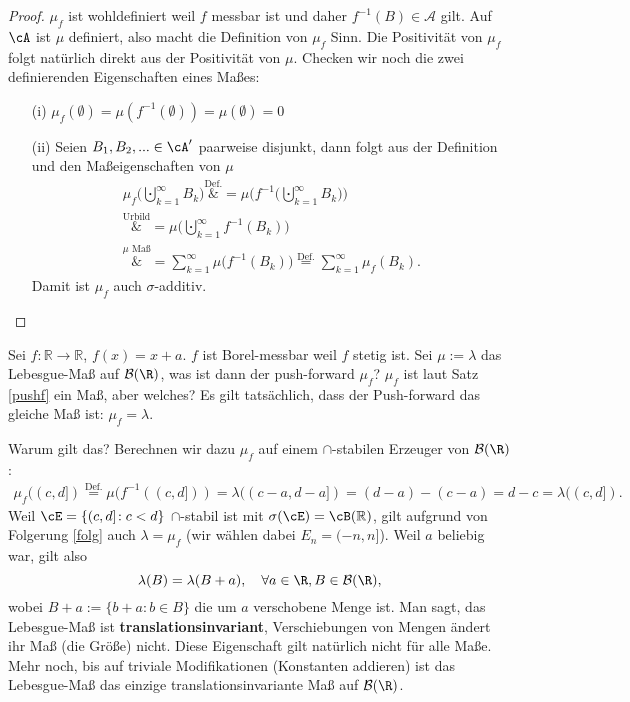 \begin{proof}
	$\mu_f$ ist wohldefiniert weil $f$ messbar ist und daher $f^{-1}(B)\in \mathcal A$ gilt. Auf $\cA$ ist $\mu$ definiert, also macht die Definition von $\mu_f$ Sinn. Die Positivit\"at von $\mu_f$ folgt nat\"urlich direkt aus der Positivit\"at von $\mu$. Checken wir noch die zwei definierenden Eigenschaften eines Ma\ss es:
	\begin{itemize}
		\item[(i)] $\mu_f ( \emptyset) = \mu\left(f^{-1}(\emptyset)\right) = \mu(\emptyset) = 0$
		\item[(ii)] Seien $B_1,B_2,... \in \cA'$ paarweise disjunkt, dann folgt aus der Definition und den Ma\ss eigenschaften von $\mu$
		\begin{align*}
			\mu_f\Big(\bigcupdot_{k=1}^{\infty}B_k\Big)\overset{\text{Def.}}&{=} \mu\Big(f^{-1}\Big(\bigcupdot_{k=1}^{\infty}B_k\Big)\Big)\\
			 \overset{\text{Urbild}}&{=} \mu\Big(\bigcupdot_{k=1}^{\infty}f^{-1}(B_k)\Big)\\
			\overset{\mu\text{ Ma\ss}}&{=} \sum\limits_{k=1}^{\infty} \mu\Big( f^{-1}(B_k)\Big) \overset{\text{Def.}}{=} \sum\limits_{k=1}^{\infty} \mu_f(B_k).
		\end{align*}
		Damit ist $\mu_f$ auch $\sigma$-additiv.
	\end{itemize}
\end{proof}

\begin{beispiel} 
	Sei $f \! : \mathbb{R} \rightarrow \mathbb{R}$, $f(x) = x + a$. $f$ ist Borel-messbar weil $f$ stetig ist. Sei $\mu:=\lambda$ das Lebesgue-Maß auf $\mathcal B(\R)$, was ist dann der push-forward $\mu_f$? $\mu_f$ ist laut Satz \ref{pushf} ein Maß, aber welches? Es gilt tats\"achlich, dass der Push-forward das gleiche Ma\ss{} ist: $\mu_f = \lambda$.
	
	Warum gilt das? Berechnen wir dazu $\mu_f$ auf einem $\cap$-stabilen Erzeuger von $\mathcal B(\R)$:
	\begin{gather*}
		\mu_f((c,d]) \overset{\text{Def.}}{=} \mu(f^{-1}((c,d])) = \lambda((c-a,d-a]) = (d-a) - (c-a) = d-c=\lambda((c,d]).
	\end{gather*}	
	Weil $\cE = \{ (c,d] \! : c<d \}$ $\cap$-stabil ist mit $\sigma(\cE) = \cB(\mathbb{R})$, gilt aufgrund von Folgerung \ref{folg} auch $\lambda = \mu_f$ (wir w\"ahlen dabei $E_n=(-n,n]$). Weil $a$ beliebig war, gilt also $$\lambda(B) = \lambda(B + a),\quad \forall a\in\R, B\in \mathcal B(\R),$$ wobei $B+a := \{ b+a:b\in B \}$ die um $a$ verschobene Menge ist. Man sagt, das Lebesgue-Maß ist \textbf{translationsinvariant}, Verschiebungen von Mengen \"andert ihr Ma\ss{} (die \glqq Gr\"o\ss e\grqq) nicht. Diese Eigenschaft gilt nat\"urlich nicht f\"ur alle Ma\ss e. Mehr noch, bis auf triviale Modifikationen (Konstanten addieren) ist das Lebesgue-Ma\ss{} das einzige translationsinvariante Ma\ss{} auf $\mathcal B(\R)$.
\end{beispiel}

